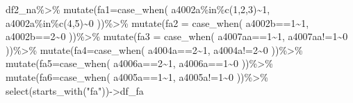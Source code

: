 \documentclass[
  oneside]{book}
\newenvironment{Shaded}{\begin{snugshade}}{\end{snugshade}}
\newcommand{\AttributeTok}[1]{\textcolor[rgb]{0.77,0.63,0.00}{#1}}
\newcommand{\DecValTok}[1]{\textcolor[rgb]{0.00,0.00,0.81}{#1}}
\newcommand{\FunctionTok}[1]{\textcolor[rgb]{0.00,0.00,0.00}{#1}}
\newcommand{\NormalTok}[1]{#1}
\newcommand{\OtherTok}[1]{\textcolor[rgb]{0.56,0.35,0.01}{#1}}
\newcommand{\SpecialCharTok}[1]{\textcolor[rgb]{0.00,0.00,0.00}{#1}}
\newcommand{\StringTok}[1]{\textcolor[rgb]{0.31,0.60,0.02}{#1}}
\begin{document}
\begin{Shaded}
\begin{Highlighting}[]
\NormalTok{df2\_na}\SpecialCharTok{\%\textgreater{}\%}
  \FunctionTok{mutate}\NormalTok{(}\AttributeTok{fa1=}\FunctionTok{case\_when}\NormalTok{(}
\NormalTok{    a4002a}\SpecialCharTok{\%in\%}\FunctionTok{c}\NormalTok{(}\DecValTok{1}\NormalTok{,}\DecValTok{2}\NormalTok{,}\DecValTok{3}\NormalTok{)}\SpecialCharTok{\textasciitilde{}}\DecValTok{1}\NormalTok{,}
\NormalTok{    a4002a}\SpecialCharTok{\%in\%}\FunctionTok{c}\NormalTok{(}\DecValTok{4}\NormalTok{,}\DecValTok{5}\NormalTok{)}\SpecialCharTok{\textasciitilde{}}\DecValTok{0}
\NormalTok{  ))}\SpecialCharTok{\%\textgreater{}\%}
  \FunctionTok{mutate}\NormalTok{(}\AttributeTok{fa2 =} \FunctionTok{case\_when}\NormalTok{(}
\NormalTok{    a4002b}\SpecialCharTok{==}\DecValTok{1}\SpecialCharTok{\textasciitilde{}}\DecValTok{1}\NormalTok{,}
\NormalTok{    a4002b}\SpecialCharTok{==}\DecValTok{2}\SpecialCharTok{\textasciitilde{}}\DecValTok{0}
\NormalTok{  ))}\SpecialCharTok{\%\textgreater{}\%}
   \FunctionTok{mutate}\NormalTok{(}\AttributeTok{fa3 =} \FunctionTok{case\_when}\NormalTok{(}
\NormalTok{    a4007aa}\SpecialCharTok{==}\DecValTok{1}\SpecialCharTok{\textasciitilde{}}\DecValTok{1}\NormalTok{,}
\NormalTok{    a4007aa}\SpecialCharTok{!=}\DecValTok{1}\SpecialCharTok{\textasciitilde{}}\DecValTok{0}
\NormalTok{  ))}\SpecialCharTok{\%\textgreater{}\%}
  \FunctionTok{mutate}\NormalTok{(}\AttributeTok{fa4=}\FunctionTok{case\_when}\NormalTok{(}
\NormalTok{    a4004a}\SpecialCharTok{==}\DecValTok{2}\SpecialCharTok{\textasciitilde{}}\DecValTok{1}\NormalTok{,}
\NormalTok{    a4004a}\SpecialCharTok{!=}\DecValTok{2}\SpecialCharTok{\textasciitilde{}}\DecValTok{0}
\NormalTok{  ))}\SpecialCharTok{\%\textgreater{}\%}
  \FunctionTok{mutate}\NormalTok{(}\AttributeTok{fa5=}\FunctionTok{case\_when}\NormalTok{(}
\NormalTok{    a4006a}\SpecialCharTok{==}\DecValTok{2}\SpecialCharTok{\textasciitilde{}}\DecValTok{1}\NormalTok{,}
\NormalTok{    a4006a}\SpecialCharTok{==}\DecValTok{1}\SpecialCharTok{\textasciitilde{}}\DecValTok{0}
\NormalTok{  ))}\SpecialCharTok{\%\textgreater{}\%}
   \FunctionTok{mutate}\NormalTok{(}\AttributeTok{fa6=}\FunctionTok{case\_when}\NormalTok{(}
\NormalTok{    a4005a}\SpecialCharTok{==}\DecValTok{1}\SpecialCharTok{\textasciitilde{}}\DecValTok{1}\NormalTok{,}
\NormalTok{    a4005a}\SpecialCharTok{!=}\DecValTok{1}\SpecialCharTok{\textasciitilde{}}\DecValTok{0}
\NormalTok{  ))}\SpecialCharTok{\%\textgreater{}\%}
  \FunctionTok{select}\NormalTok{(}\FunctionTok{starts\_with}\NormalTok{(}\StringTok{"fa"}\NormalTok{))}\OtherTok{{-}\textgreater{}}\NormalTok{df\_fa}
\end{Highlighting}
\end{Shaded}
\end{document}
